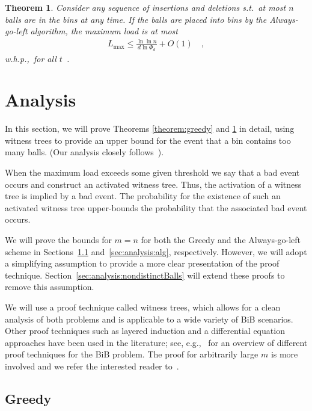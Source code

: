 \documentclass[a4paper,12pt]{article}
\newcommand\load{L_{\mathrm{max}}}
\newtheorem{theorem}{Theorem}
\begin{document}
\begin{theorem}
\label{theorem:aglm}
Consider any sequence of insertions and deletions s.t.~at most $n$ balls are in the bins at any time. If the balls are placed into bins by the Always-go-left algorithm, the maximum load is at most 
\begin{align*}
\load \leq \frac{\ln\ln n}{d  \ln \Phi_d} + O(1) \quad ,
\end{align*}
w.h.p.,~for all $t$~\cite{VOC03}.
\end{theorem}

\section{Analysis}
\label{sec:analysis}
In this section, we will prove Theorems \ref{theorem:greedy} and \ref{theorem:aglm} in detail, using witness trees to provide an upper bound for the event that a bin contains too many balls. (Our analysis closely follows~\cite{VOC03}).

When the maximum load exceeds some given threshold we say that a bad event occurs and construct an activated witness tree. Thus, the activation of a witness tree is implied by a bad event. The probability for the existence of such an activated witness tree upper-bounds the probability that the associated bad event occurs.

We will prove the bounds for $m=n$ for both the Greedy and the Always-go-left scheme in Sections~\ref{sec:analysis:greedy} and~\ref{sec:analysis:alg}, respectively. However, we will adopt a simplifying assumption to provide a more clear presentation of the proof technique. Section~\ref{sec:analysis:nondistinctBalls} will extend these proofs to remove this assumption. 

We will use a proof technique called witness trees, which allows for a clean analysis of both problems and is applicable to a wide variety of BiB scenarios. Other proof techniques such as layered induction and a differential equation approaches have been used in the literature; see, e.g.,~\cite{MRS01} for an overview of different proof techniques for the BiB problem. The proof for arbitrarily large $m$ is more involved and we refer the interested reader to~\cite{BCSV06, TW13}.

\subsection{Greedy}
\label{sec:analysis:greedy}
\end{document}
